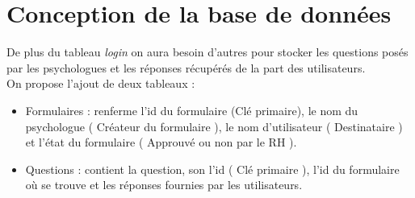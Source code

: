 \documentclass[12]{article}
\begin{document}
\section{Conception de la base de données}

De plus du tableau \textit{login} on aura besoin d'autres pour stocker les questions posés par les psychologues et les réponses récupérés de la part des utilisateurs.\\
On propose l'ajout de deux tableaux :\\
\begin{itemize}
\item Formulaires : renferme l'id du formulaire (Clé primaire), le nom du psychologue ( Créateur du formulaire ), le nom d'utilisateur ( Destinataire ) et l'état du formulaire ( Approuvé ou non par le RH ).\\
\item Questions : contient la question, son l'id ( Clé primaire ), l'id du formulaire où se trouve et les réponses fournies par les utilisateurs.
\end{itemize}
\end{document}
